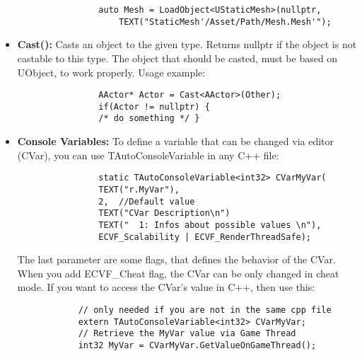 \documentclass[10pt]{article}
\begin{document}
\begin{multicols*}{5}
\begin{itemize}
			\begin{verbatim}
				auto Mesh = LoadObject<UStaticMesh>(nullptr,
				    TEXT("StaticMesh'/Asset/Path/Mesh.Mesh'");
			\end{verbatim}
			\item \textbf{Cast():} Casts an object to the given type. Returns nullptr if the object is not castable to this type. The object that should be casted, must be based on UObject, to work properly.
			Usage example:
			\begin{verbatim}
				AActor* Actor = Cast<AActor>(Other);
				if(Actor != nullptr) {
				/* do something */ }
			\end{verbatim}
			\item \textbf{Console Variables:} To define a variable that can be changed via editor (CVar), you can use TAutoConsoleVariable in any C++ file:
			\begin{verbatim}
				static TAutoConsoleVariable<int32> CVarMyVar(
				TEXT("r.MyVar"),
				2,	//Default value
				TEXT("CVar Description\n")
				TEXT("  1: Infos about possible values \n"),
				ECVF_Scalability | ECVF_RenderThreadSafe);
			\end{verbatim}
			The last parameter are some flags, that defines the behavior of the CVar. When you add ECVF\_Cheat flag, the CVar can be only changed in cheat mode. If you want to access the CVar's value in C++, then use this:
			\begin{verbatim}
			// only needed if you are not in the same cpp file
			extern TAutoConsoleVariable<int32> CVarMyVar;
			// Retrieve the MyVar value via Game Thread
			int32 MyVar = CVarMyVar.GetValueOnGameThread();
			\end{verbatim}
	\end{itemize}


\end{multicols*}
\end{document}
